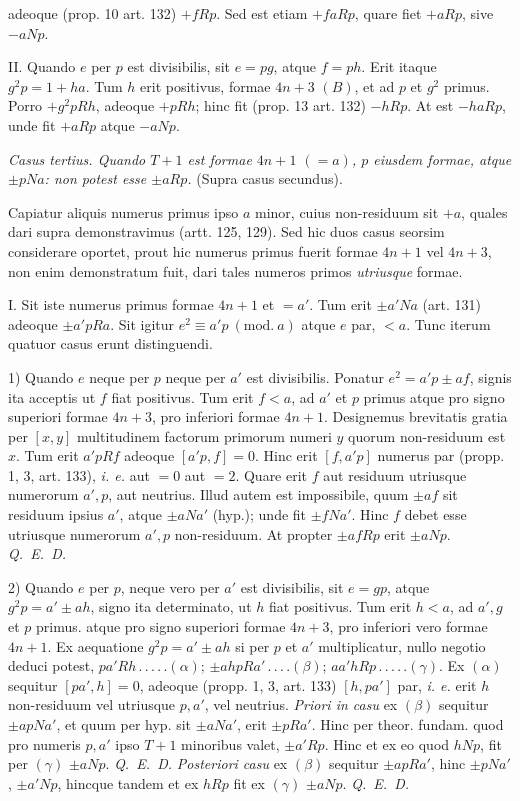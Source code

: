 \begingroup
{}
adeoque (prop. 10 art. 132) $+fRp$. Sed est etiam $+faRp$, quare fiet $+aRp$, sive $-aNp$.

II. Quando $e$ per $p$ est divisibilis, sit $e=pg$, atque $f=ph$. Erit itaque $g^2p=1+ha$. Tum $h$ erit positivus, formae $4n+3$ $(B)$, et ad $p$ et $g^2$ primus. Porro $+g^2pRh$, adeoque $+pRh$; hinc fit (prop. 13 art. 132) $-hRp$. At est $-haRp$, unde fit $+aRp$ atque $-aNp$.


\textit{Casus tertius. Quando $T+1$ est formae $4n+1$ $(=a)$, $p$ eiusdem formae, atque $\pm pNa$: non potest esse $\pm aRp$.} (Supra casus secundus).

Capiatur aliquis numerus primus ipso $a$ minor, cuius non-residuum sit $+a$, quales dari supra demonstravimus (artt. 125, 129). Sed hic duos casus seorsim considerare oportet, prout hic numerus primus fuerit formae $4n+1$ vel $4n+3$, non enim demonstratum fuit, dari tales numeros primos \textit{utriusque} formae.

I. Sit iste numerus primus formae $4n+1$ et $=a'$. Tum erit $\pm a'Na$ (art. 131) adeoque $\pm a'pRa$. Sit igitur $e^2\equiv a'p\ (\mathrm{mod.}\ a)$ atque $e$ par, $<a$. Tunc iterum quatuor casus erunt distinguendi.

1) Quando $e$ neque per $p$ neque per $a'$ est divisibilis. Ponatur $e^2=a'p\pm af$, signis ita acceptis ut $f$ fiat positivus. Tum erit $f<a$, ad $a'$ et $p$ primus atque pro signo superiori formae $4n+3$, pro inferiori formae $4n+1$. Designemus brevitatis gratia per $[x,y]$ multitudinem factorum primorum numeri $y$ quorum non-residuum est $x$. Tum erit $a'pRf$ adeoque $[a'p,f]=0$. Hinc erit $[f,a'p]$ numerus par (propp. 1, 3, art. 133), \textit{i. e.} aut $=0$ aut $=2$. Quare erit $f$ aut residuum utriusque numerorum $a',p$, aut neutrius. Illud autem est impossibile, quum $\pm af$ sit residuum ipsius $a'$, atque $\pm aNa'$ (hyp.); unde fit $\pm fNa'$. Hinc $f$ debet esse utriusque numerorum $a',p$ non-residuum. At propter $\pm afRp$ erit $\pm aNp$. \textit{Q.~E.~D.}

2) Quando $e$ per $p$, neque vero per $a'$ est divisibilis, sit $e=gp$, atque $g^2p=a'\pm ah$, signo ita determinato, ut $h$ fiat positivus. Tum erit $h<a$, ad $a',g$ et $p$ primus. atque pro signo superiori formae $4n+3$, pro inferiori vero formae $4n+1$. Ex aequatione $g^2p=a'\pm ah$ si per $p$ et $a'$ multiplicatur, nullo negotio deduci potest, $pa'Rh\,.\,.\,.\,.\,.(\alpha)$; $\pm ahpRa'\,.\,.\,.\,.(\beta)$; $aa'hRp\,.\,.\,.\,.\,.(\gamma)$. Ex $(\alpha)$ sequitur $[pa',h]=0$, adeoque (propp. 1, 3, art. 133) $[h,pa']$ par, \textit{i. e.}
erit $h$ non-residuum vel utriusque $p,a'$, vel neutrius. \textit{Priori in casu} ex $(\beta)$ sequitur $\pm apNa'$, et quum per hyp. sit $\pm aNa'$, erit $\pm pRa'$. Hinc per theor. fundam. quod pro numeris $p,a'$ ipso $T+1$ minoribus valet, $\pm a'Rp$. Hinc et ex eo quod $hNp$, fit per $(\gamma)$ $\pm aNp$. \textit{Q.~E.~D.} \textit{Posteriori casu} ex $(\beta)$ sequitur $\pm apRa'$, hinc $\pm pNa'$, $\pm a'Np$, hincque tandem et ex $hRp$ fit ex $(\gamma)$ $\pm aNp$. \textit{Q.~E.~D.}

